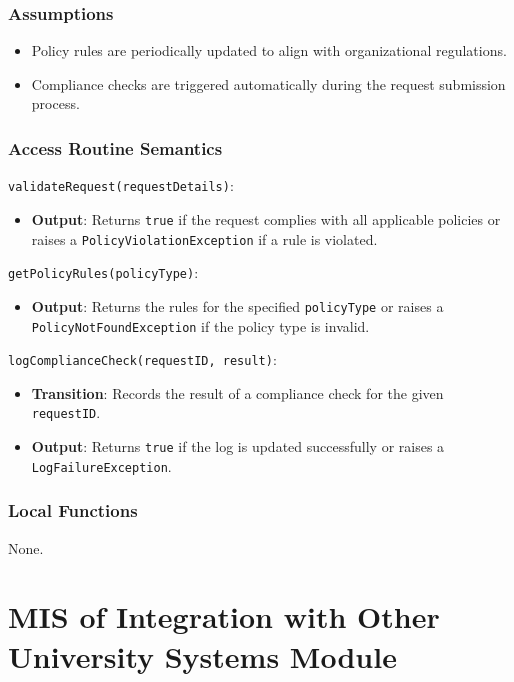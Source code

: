 \documentclass[12pt, titlepage]{article}
\begin{document}
\subsubsection{Assumptions}
\begin{itemize}
    \item Policy rules are periodically updated to align with organizational regulations.
    \item Compliance checks are triggered automatically during the request submission process.
\end{itemize}

\subsubsection{Access Routine Semantics}

\noindent \texttt{validateRequest(requestDetails)}:
\begin{itemize}
    \item \textbf{Output}: Returns \texttt{true} if the request complies with all applicable policies or raises a \texttt{PolicyViolationException} if a rule is violated.
\end{itemize}

\noindent \texttt{getPolicyRules(policyType)}:
\begin{itemize}
    \item \textbf{Output}: Returns the rules for the specified \texttt{policyType} or raises a \texttt{PolicyNotFoundException} if the policy type is invalid.
\end{itemize}

\noindent \texttt{logComplianceCheck(requestID, result)}:
\begin{itemize}
    \item \textbf{Transition}: Records the result of a compliance check for the given \texttt{requestID}.
    \item \textbf{Output}: Returns \texttt{true} if the log is updated successfully or raises a \texttt{LogFailureException}.
\end{itemize}

\subsubsection{Local Functions}
None.

\section{MIS of Integration with Other University Systems Module}
\end{document}
